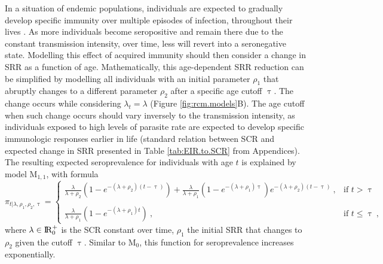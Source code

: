 In a situation of endemic populations, individuals are expected to gradually develop specific immunity over multiple episodes of infection, throughout their lives \cite{perlmann2002malaria}.
As more individuals become seropositive and remain there due to the constant transmission intensity, over time, less will revert into a seronegative state.
Modelling this effect of acquired immunity should then consider a change in SRR as a function of age.
Mathematically, this age-dependent SRR reduction can be simplified by modelling all individuals with an initial parameter $\rho_1$ that abruptly changes to a different parameter $\rho_2$ after a specific age cutoff $\uptau$.
The change occurs while considering $\lambda_t=\lambda$ (Figure \ref{fig:rcm.models}B).
The age cutoff when such change occurs should vary inversely to the transmission intensity, as individuals exposed to high levels of parasite rate are expected to develop specific immunologic responses earlier in life (standard relation between SCR and expected change in SRR presented in Table \ref{tab:EIR.to.SCR} from Appendices).
The resulting expected seroprevalence for individuals with age $t$ is explained by model M$_{1,1}$, with formula
%
\begin{equation}
    \label{eq:rcm.reduction.srr}
    \pi_{t | \lambda, \rho_1, \rho_2, \uptau} = \left\{\begin{array}{ll} \frac{\lambda}{\lambda+\rho_{2}}\left(1-e^{-(\lambda+\rho_{2})(t-\uptau)}\right)+\frac{\lambda}{\lambda+\rho_{1}}\left(1-e^{-(\lambda+\rho_{1})\uptau}\right)e^{-(\lambda+\rho_{2})(t-\uptau)}\ , & \text{if $t>\uptau$}\\\\  
    \frac{\lambda}{\lambda+\rho_{1}}\left(1-e^{-(\lambda+\rho_{1})t}\right)\ , & \text{if $t\le\uptau$}\ ,\end{array} \right.
\end{equation}
%
\noindent
where $\lambda \in \rm I\!R_{0}^{+}$ is the SCR constant over time, $\rho_1$ the initial SRR that changes to $\rho_2$ given the cutoff $\uptau$.
Similar to M$_{0}$, this function for seroprevalence increases exponentially.


